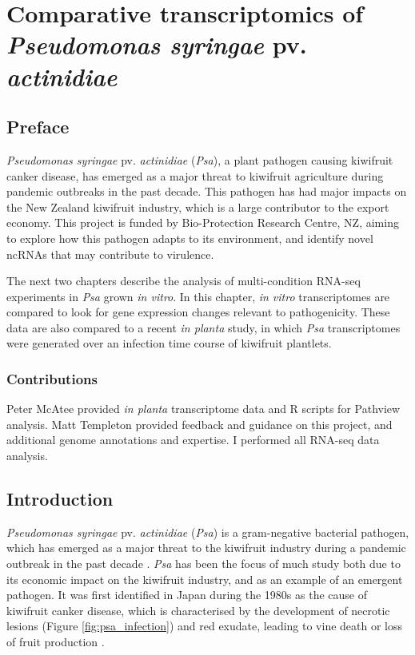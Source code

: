 \chapter{Comparative transcriptomics of \textit{Pseudomonas syringae} pv. \textit{actinidiae}}
\label{chap:psa_RNAseq}
\section{Preface}
\textit{Pseudomonas syringae} pv. \textit{actinidiae} (\textit{Psa}), a plant pathogen causing kiwifruit canker disease, has emerged as a major threat to kiwifruit agriculture during pandemic outbreaks in the past decade. This pathogen has had major impacts on the New Zealand kiwifruit industry, which is a large contributor to the export economy. This project is funded by Bio-Protection Research Centre, NZ, aiming to explore how this pathogen adapts to its environment, and identify novel ncRNAs that may contribute to virulence.

The next two chapters describe the analysis of multi-condition RNA-seq experiments in \textit{Psa} grown \textit{in vitro}. In this chapter, \textit{in vitro} transcriptomes are compared to look for gene expression changes relevant to pathogenicity. These data are also compared to a recent \textit{in planta} study, in which \textit{Psa} transcriptomes were generated over an infection time course of kiwifruit plantlets. 


\subsection{Contributions}
Peter McAtee provided \textit{in planta} transcriptome data and R scripts for Pathview analysis. Matt Templeton provided feedback and guidance on this project, and additional genome annotations and expertise. I performed all RNA-seq data analysis. 
\newpage

\section{Introduction}

\textit{Pseudomonas syringae} pv. \textit{actinidiae} (\textit{Psa}) is a gram-negative bacterial pathogen, which has emerged as a major threat to the kiwifruit industry during a pandemic outbreak in the past decade \citep{Scortichini2012-al,Tanner2015-fe}. \textit{Psa} has been the focus of much study both due to its economic impact on the kiwifruit industry, and as an example of an emergent pathogen. It was first identified in Japan during the 1980s as the cause of kiwifruit canker disease, which is characterised by the development of necrotic lesions (Figure \ref{fig:psa_infection}) and red exudate, leading to vine death or loss of fruit production \citep{Takikawa1989-fw,Serizawa1989-wj}.

